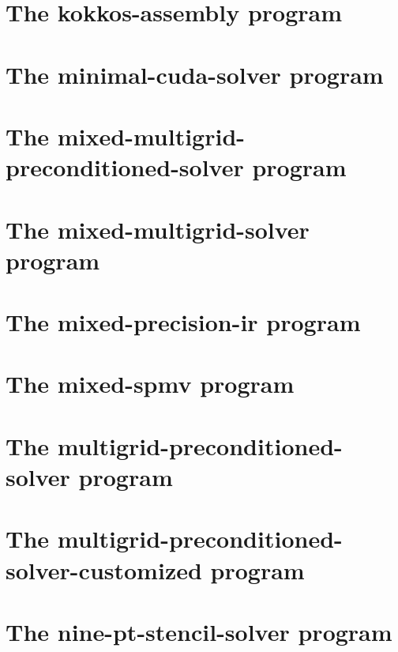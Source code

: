 \let\mypdfximage\pdfximage\def\pdfximage{\immediate\mypdfximage}\documentclass[twoside]{book}
\newcommand{\+}{\discretionary{\mbox{\scriptsize$\hookleftarrow$}}{}{}}
\begin{document}
\chapter{The kokkos-\/assembly program}
\label{kokkos_assembly}

\chapter{The minimal-\/cuda-\/solver program}
\label{minimal_cuda_solver}

\chapter{The mixed-\/multigrid-\/preconditioned-\/solver program}
\label{mixed_multigrid_preconditioned_solver}

\chapter{The mixed-\/multigrid-\/solver program}
\label{mixed_multigrid_solver}

\chapter{The mixed-\/precision-\/ir program}
\label{mixed_precision_ir}

\chapter{The mixed-\/spmv program}
\label{mixed_spmv}

\chapter{The multigrid-\/preconditioned-\/solver program}
\label{multigrid_preconditioned_solver}

\chapter{The multigrid-\/preconditioned-\/solver-\/customized program}
\label{multigrid_preconditioned_solver_customized}

\chapter{The nine-\/pt-\/stencil-\/solver program}
\label{nine_pt_stencil_solver}

\end{document}
